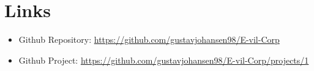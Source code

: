 \documentclass[report/main.tex]{subfiles}
\begin{document}
    \section{Links}
        \begin{itemize}
            \item Github Repository: \hyperlink{https://github.com/gustavjohansen98/E-vil-Corp}{https://github.com/gustavjohansen98/E-vil-Corp}
            \item Github Project: \hyperlink{https://github.com/gustavjohansen98/E-vil-Corp/projects/1}{https://github.com/gustavjohansen98/E-vil-Corp/projects/1}
        \end{itemize}
\end{document}

